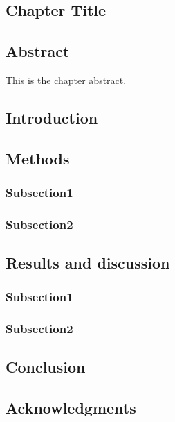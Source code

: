 \chapter{}
\section*{Chapter Title}
\label{ch:3}


\newpage
\section*{Abstract}

This is the chapter abstract.

\newpage
\section{Introduction}

\newpage
\section{Methods}
\subsection{Subsection1}
\subsection{Subsection2}

\newpage
\section{Results and discussion}
\subsection{Subsection1}
\subsection{Subsection2}

\newpage
\section{Conclusion}


\section*{Acknowledgments}
